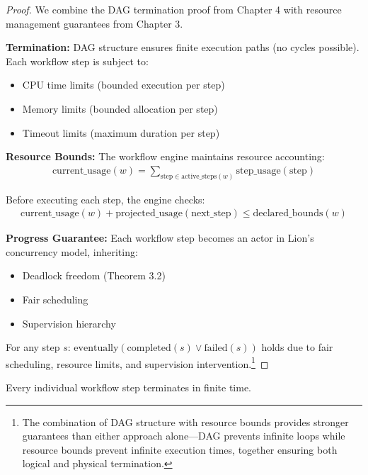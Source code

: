 \begin{proof}
We combine the DAG termination proof from Chapter 4 with resource management guarantees from Chapter 3.

\textbf{Termination:} DAG structure ensures finite execution paths (no cycles possible). Each workflow step is subject to:
\begin{itemize}
\item CPU time limits (bounded execution per step)
\item Memory limits (bounded allocation per step)
\item Timeout limits (maximum duration per step)
\end{itemize}

\textbf{Resource Bounds:} The workflow engine maintains resource accounting:
\begin{align}
\text{current\_usage}(w) = \sum_{\text{step} \in \text{active\_steps}(w)} \text{step\_usage}(\text{step})
\end{align}

Before executing each step, the engine checks:
\begin{align}
\text{current\_usage}(w) + \text{projected\_usage}(\text{next\_step}) \leq \text{declared\_bounds}(w)
\end{align}

\textbf{Progress Guarantee:} Each workflow step becomes an actor in Lion's concurrency model, inheriting:
\begin{itemize}
\item Deadlock freedom (Theorem 3.2)
\item Fair scheduling
\item Supervision hierarchy
\end{itemize}

For any step $s$: $\text{eventually}(\text{completed}(s) \lor \text{failed}(s))$ holds due to fair scheduling, resource limits, and supervision intervention.\footnote{The combination of DAG structure with resource bounds provides stronger guarantees than either approach alone—DAG prevents infinite loops while resource bounds prevent infinite execution times, together ensuring both logical and physical termination.}
\end{proof}

\newpage

\begin{lemma}
\label{lem:step-termination}
Every individual workflow step terminates in finite time.
\end{lemma}

